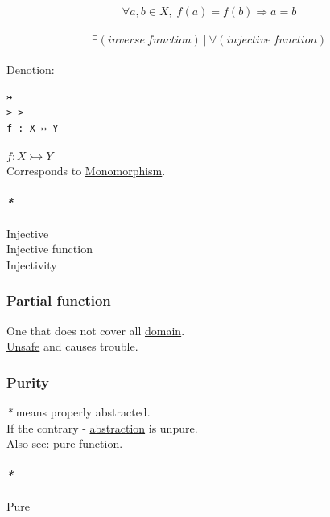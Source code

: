 \documentclass[11pt]{article}
\begin{document}
$$ \forall a,b \in X, \; f(a)=f(b) \Rightarrow a=b $$\\

$$ \exists (inverse \ function) \ | \ \forall (injective \ function) $$\\

Denotion:\\
\begin{verbatim}
↣
>->
f : X ↣ Y
\end{verbatim}
\(f : X \rightarrowtail Y\)\\

Corresponds to \hyperref[orgfde2588]{Monomorphism}.\\

\paragraph{\emph{*}}
\label{sec:org937ca8d}

\label{org51366e0}Injective\\
\label{org7c0fa28}Injective function\\
\label{orge0ecd57}Injectivity\\

\subsubsection{\label{orge9a6e2e}Partial function}
\label{sec:orgc82a778}
One that does not cover all \hyperref[org494b48a]{domain}.\\
\hyperref[org8ae67d0]{Unsafe} and causes trouble.\\

\subsubsection{\label{org610c721}Purity}
\label{sec:orgdc5404f}
\emph{*} means properly abstracted.\\

If the contrary - \hyperref[org3470ee4]{abstraction} is unpure.\\

Also see: \hyperref[orgf4f5f7d]{pure function}.\\

\paragraph{\emph{*}}
\label{sec:org0c71be4}

\label{org1bf8e16}Pure\\
\end{document}
